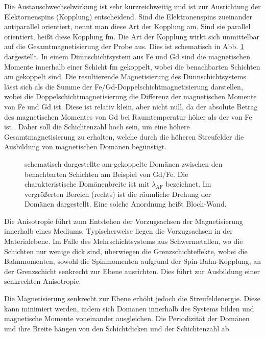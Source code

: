 \noindent
Die Austauschwechselwirkung ist sehr kurzreichweitig und ist zur Ausrichtung der Elektornenspins (Kopplung) entscheidend. Sind die Elektronenspins zueinander antiparallel orientiert, nennt man diese Art der Kopplung \gls{am}. Sind sie parallel orientiert, heißt diese Kopplung \gls{fm}. Die Art der Kopplung wirkt sich unmittelbar auf die Gesamtmagnetisierung der Probe aus. Dies ist schematisch in Abb. \ref{fig:am_fm_kopplung} dargestellt. In einem Dünnschichtsystem aus Fe und Gd sind die magnetischen Momente innerhalb einer Schicht \gls{fm} gekoppelt, wobei die benachbarten Schichten \gls{am} gekoppelt sind. Die resultierende Magnetisierung des Dünnschichtsystems lässt sich als die Summe der Fe/Gd-Doppelschichtmagnetisierung darstellen, wobei die Doppelschichtmagnetisierung die Differenz der magnetischen Momente von Fe und Gd ist. Diese ist relativ klein, aber nicht null, da der absolute Betrag des magnetischen Momentes von Gd bei Raumtemperatur höher als der von Fe ist \cite{hintermayr_structure_2021_fixed}. Daher soll die Schichtenzahl hoch sein, um eine höhere Gesamtmagnetisierung zu erhalten, welche durch die höheren Streufelder die Ausbildung von magnetischen Domänen begünstigt.
\begin{figure}[H]
    \centering
    
    \caption{schematisch dargestellte \gls{am}-gekoppelte Domänen zwischen den benachbarten Schichten am Beispiel von Gd/Fe. Die charakteristische Domänenbreite ist mit $\lambda_{\text{AF}}$ bezeichnet. Im vergrößerten Bereich (rechts) ist die räumliche Drehung der Domänen dargestellt. Eine solche Anordnung heißt Bloch-Wand.}
    \label{fig:am_fm_kopplung}
\end{figure}
\noindent
Die Anisotropie führt zum Entstehen der Vorzugsachsen der Magnetisierung innerhalb eines Mediums. Typischerweise liegen die Vorzugsachsen in der Materialebene. Im Falle des Mehrschichtsystems aus Schwermetallen, wo die Schichten nur wenige  dick sind, überwiegen die Grenzschichteffekte, wobei die Bahnmomenten, sowohl die Spinmomenten aufgrund der Spin-Bahn-Kopplung, an der Grenzschicht senkrecht zur Ebene ausrichten. Dies führt zur Ausbildung einer senkrechten Anisotropie.

\noindent
Die Magnetisierung senkrecht zur Ebene erhöht jedoch die Streufeldenergie. Diese kann minimiert werden, indem sich Domänen innerhalb des Systems bilden und magnetische Momente voneinander ausgleichen. Die Periodizität der Domänen und ihre Breite hängen von den Schichtdicken und der Schichtenzahl ab. 

